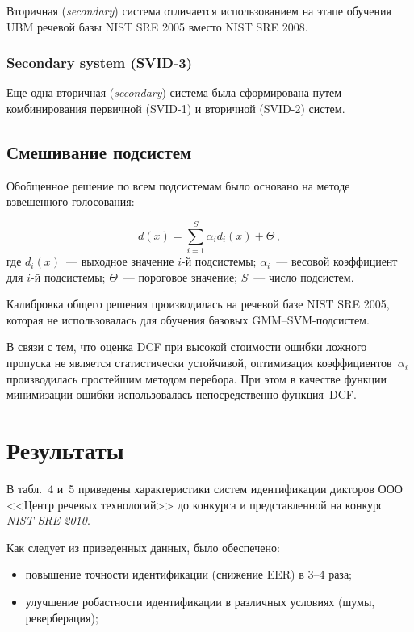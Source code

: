 \begin{multicols}{2}
  Вторичная (\textit{secondary}) система отличается использованием на этапе обучения 
UBM речевой базы NIST SRE 2005 вместо NIST SRE 2008.

\vspace*{-1pt}
  
\subsubsection{Secondary system (SVID-3)}
  
  Еще одна вторичная (\textit{secondary}) система была сформирована путем 
комбинирования первичной (SVID-1) и вторичной (SVID-2) систем.
  
\subsection{Смешивание подсистем} %
  
  Обобщенное решение по всем подсистемам было основано на методе 
взвешенного голосования:

\noindent
  $$
  d(x) =\sum\limits_{i=1}^S \alpha_i d_i(x)+\Theta\,,
  $$
  где $d_i(x)$~--- выходное значение $i$-й подсистемы; $\alpha_i$~--- весовой 
коэффициент для $i$-й подсистемы; $\Theta$~--- пороговое значение; $S$~--- 
чис\-ло подсистем.
  
  Калибровка общего решения производилась на речевой базе {NIST SRE 
2005}, которая не использовалась для обучения базовых 
GMM--SVM-под\-систем.
  
  В связи с тем, что оценка DCF при высокой стоимости ошибки ложного 
пропуска не является статистически устойчивой, оптимизация 
коэффициентов~$\alpha_i$ производилась простейшим методом перебора. При 
этом в качестве функции минимизации ошибки использовалась непосредственно 
функция~DCF.

\vspace*{-6pt}

\section{Результаты}
  
  В табл.~4 и~5 приведены характеристики сис\-тем идентификации дикторов 
ООО <<Центр речевых технологий>> до конкурса и представленной на конкурс 
\textit{NIST SRE 2010}. 


  
  Как следует из приведенных данных, было обеспечено:\\[-14pt]
  \begin{itemize}
\item повышение точности идентификации (снижение EER) в 3--4 раза;\\[-14pt]
\item улучшение робастности идентификации в различных условиях (шумы, 
реверберация);
\end{itemize}

\end{multicols}

